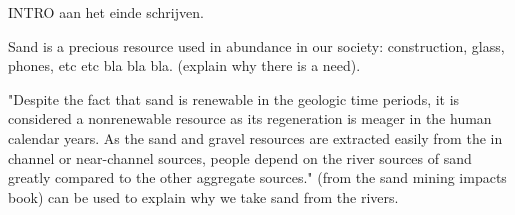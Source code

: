 INTRO aan het einde schrijven.

Sand is a precious resource used in abundance in our society: construction, glass, phones, etc etc bla bla bla. (explain why there is a need).


"Despite the fact that sand is renewable in the geologic time periods, it is considered a nonrenewable resource as its regeneration is meager in the human calendar years. As the sand and gravel resources are extracted easily from the in channel or near-channel sources, people depend on the river sources of sand greatly compared to the other aggregate sources."
(from the sand mining impacts book)
can be used to explain why we take sand from the rivers.

